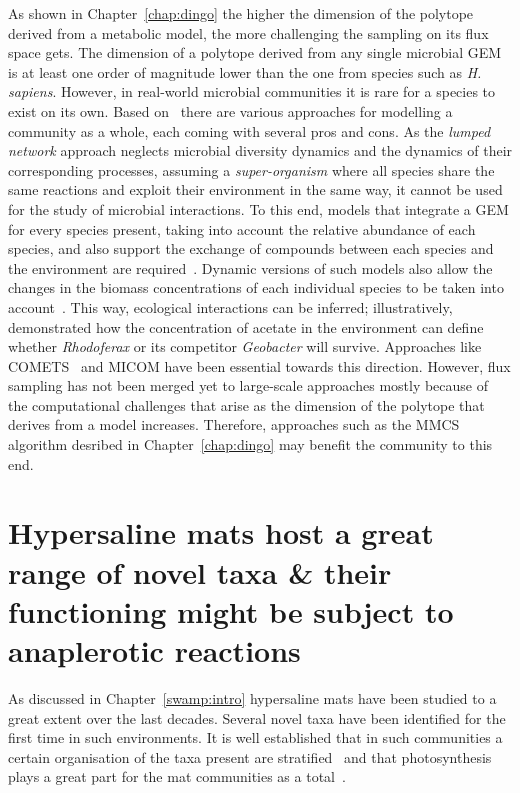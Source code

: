    As shown in Chapter~\ref{chap:dingo} 
   the higher the dimension of the polytope derived from a metabolic model, 
   the more challenging the sampling on its flux space gets.
   The dimension of a polytope derived from any single microbial GEM 
   is at least one order of magnitude lower than 
   the one from species such as \textit{H. sapiens}.
   However, in real-world microbial communities it is rare for a species to exist on its own.
   Based on~\cite{perez2016metabolic} there are various approaches for modelling a community as a whole,
   each coming with several pros and cons.
   As the \textit{lumped network} approach 
   neglects microbial diversity dynamics and the dynamics of their corresponding processes, 
   assuming a \textit{super-organism} where all species share the same reactions and exploit their environment 
   in the same way, 
   it cannot be used for the study of microbial interactions. 
   To this end, models that integrate a GEM for every species present, 
   taking into account the relative abundance of each species, 
   and also 
   support the exchange of compounds between each species and the environment are required~\citep{diener2020micom}. 
   Dynamic versions of such models also allow the 
   changes in the biomass concentrations of each individual species to be taken into account~\citep{zhuang2011genome}. 
   This way, ecological interactions can be inferred;
   illustratively,~\citeauthor{zhuang2011genome} demonstrated 
   how the concentration of acetate in the environment can define 
   whether \textit{Rhodoferax} or its competitor \textit{Geobacter} will survive. 
   Approaches like COMETS~\citep{dukovski2021metabolic} and MICOM 
   have been essential towards this direction. 
   However, flux sampling has not been merged yet to large-scale approaches 
   mostly because of the computational challenges that arise as the dimension of the polytope 
   that derives from a model increases.
   Therefore, approaches such as the MMCS algorithm desribed in 
   Chapter~\ref{chap:dingo} may benefit the community to this end.

\section{Hypersaline mats host a great range of novel taxa \& their functioning might be subject to anaplerotic reactions}
\label{conlc:mats}

   As discussed in Chapter~\ref{swamp:intro} hypersaline mats 
   have been studied to a great extent over the last decades.
   Several novel taxa have been identified for the first time in such environments. 
   It is well established that in such communities a certain organisation of 
   the taxa present are stratified~\citep{saghai2017unveiling}
   and that photosynthesis plays a great part for the mat communities as a total~\citep{oren_cyanobacteria_2015}. 

